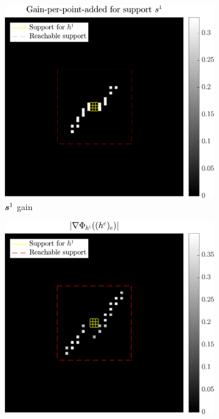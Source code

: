 \begin{figure}[!ht]\centering
	\begin{subfigure}[b]{0.24\linewidth}\centering
	\includegraphics[width=\linewidth]{figures/xp/n1/xp_128x128_sc2_angl1_K3_S3_node1_objmatrix_bestvalues.pdf}
	\caption{$\bm{s}^1$ gain}
	\end{subfigure}
	\begin{subfigure}[b]{0.24\linewidth}\centering
	\includegraphics[width=\linewidth]{figures/xp/n1/xp_128x128_sc2_angl1_K3_S3_node1_partgrad1_bestvalues.pdf}

\end{subfigure}
\end{figure}
